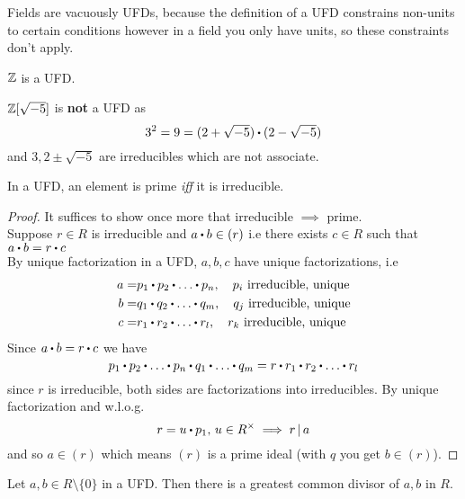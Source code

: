 \documentclass[../Main.tex]{subfiles}
\begin{document}
\begin{example}
	Fields are vacuously UFDs, because the definition of a UFD constrains non-units to certain conditions however in a field you only have units, so these constraints don't apply.
\end{example}
\begin{example}
	$\mathbb{Z}$ is a UFD.
\end{example}
\begin{example}
	$\mathbb{Z}[\sqrt{-5}]$ is \textbf{not} a UFD as
	\[3^2=9=(2+\sqrt{-5})\rdot (2-\sqrt{-5})\]
	and $3,2\pm \sqrt{-5}$ are irreducibles which are not associate.
\end{example}
\begin{prop}[title = Element in UFD is prime iff it is irreducible]
	In a UFD, an element is prime \textit{iff} it is irreducible.
\end{prop}
\begin{proof}
	It suffices to show once more that irreducible $\implies$ prime.\\
	Suppose $r\in R$ is irreducible and $a\rdot b\in (r)$ i.e there exists $c\in R$ such that $a\rdot b=r\rdot c$\\
	By unique factorization in a UFD, $a,b,c$ have unique factorizations, i.e
	\begin{align*}
	a=&p_1\rdot p_2\rdot \dots \rdot p_n,\quad p_i \text{ irreducible, unique}\\
	b=&q_1\rdot q_2\rdot \dots \rdot q_m,\quad q_j \text{ irreducible, unique}\\
	c=&r_1\rdot r_2\rdot \dots \rdot r_l,\quad r_k \text{ irreducible, unique}
	\end{align*}
	Since $a\rdot b=r\rdot c$ we have
	\[p_1\rdot p_2\rdot \dots \rdot p_n \rdot q_1 \rdot \dots \rdot q_m = r \rdot r_1 \rdot r_2\rdot  \dots \rdot r_l\]
	since $r$ is irreducible, both sides are factorizations into irreducibles. By unique factorization and w.l.o.g. 
	\[r=u\rdot p_1,\, u\in R^\times \implies \divs{r}{a}\qedhere\]
	and so $a\in (r)$ which means $(r)$ is a prime ideal (with $q$ you get $b\in (r)$).
\end{proof}
\newpage
\begin{prop}[title=Nonzero elements in UFD have GCD]
	Let $a,b\in R\setminus \{0\}$ in a UFD. Then there is a greatest common divisor of $a,b$ in $R$.
\end{prop}
\end{document}

